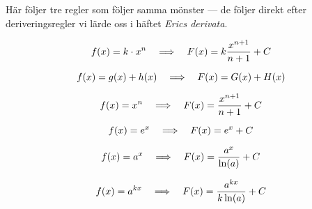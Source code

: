 \documentclass[a4paper,12pt]{article}
\begin{document}
Här följer tre regler som följer samma mönster --- de följer direkt efter deriveringsregler vi lärde oss i häftet \emph{Erics derivata}.

\begin{regel}
    \[f(x) = k\cdot x^n \hspace{1em} \Longrightarrow \hspace{1em} F(x) = k\dfrac {x^{n+1}}{n+1} + C\]
\end{regel}

\begin{regel}
    \[f(x) = g(x) + h(x) \hspace{1em} \Longrightarrow \hspace{1em} F(x) = G(x) + H(x)\]
\end{regel}

\begin{regel}
    \[f(x) = x^n \hspace{1em} \Longrightarrow \hspace{1em} F(x) = \dfrac {x^{n+1}}{n+1} + C\]
\end{regel}

\begin{regel}
    \[f(x) = e^x \hspace{1em} \Longrightarrow \hspace{1em} F(x) = e^x + C\]
\end{regel}

\begin{regel}
    \[f(x) = a^x \hspace{1em} \Longrightarrow \hspace{1em} F(x) = \dfrac{a^x}{\ln(a)} + C\]
\end{regel}

\begin{regel}
    \[f(x) = a^{kx} \hspace{1em} \Longrightarrow \hspace{1em} F(x) = \dfrac{a^{kx}}{k\ln(a)} + C\]
\end{regel}
\end{document}
